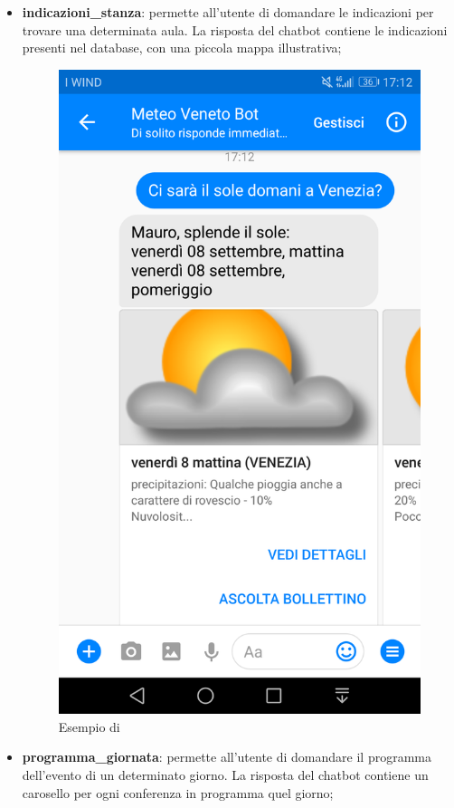 \begin{itemize}
	\item \textbf{indicazioni\_stanza}: permette all'utente di domandare le indicazioni per trovare una determinata aula. La risposta del \gls{chatbot} contiene le indicazioni presenti nel database, con una piccola mappa illustrativa;
	\begin{figure}[h!]
		\centering
		\includegraphics[scale=0.12]{../Immagini/richiesta_sole.png}
		\caption{Esempio di }
	\end{figure}			
	\item \textbf{programma\_giornata}: permette all'utente di domandare il programma dell'evento di un determinato giorno. La risposta del \gls{chatbot} contiene un carosello per ogni conferenza in programma quel giorno;

\end{itemize}
